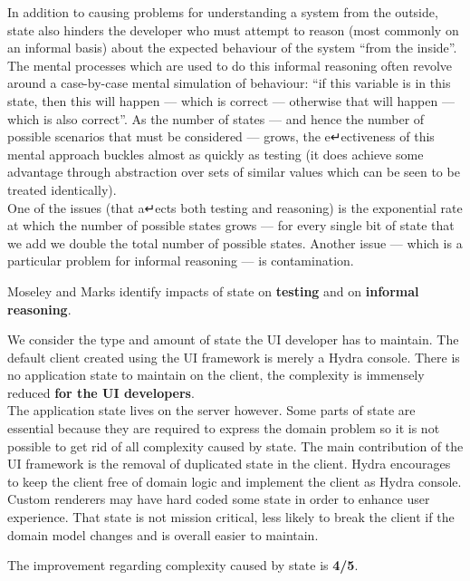 In addition to causing problems for understanding a system from the outside, state also hinders the developer who must attempt to reason (most commonly on an informal basis) about the expected behaviour of the system “from the inside”. \\
The mental processes which are used to do this informal reasoning often revolve around a case-by-case mental simulation of behaviour: “if this variable is in this state, then this will happen — which is correct — otherwise that will happen — which is also correct”. As the number of states — and hence the number of possible scenarios that must be considered — grows, the e↵ectiveness of this mental approach buckles almost as quickly as testing (it does achieve some advantage through abstraction over sets of similar values which can be seen to be treated identically). \\
One of the issues (that a↵ects both testing and reasoning) is the exponential rate at which the number of possible states grows — for every single bit of state that we add we double the total number of possible states. Another issue — which is a particular problem for informal reasoning — is contamination. \citep{outoftarpit}

Moseley and Marks identify impacts of state on \textbf{testing} and on \textbf{informal reasoning}.

We consider the type and amount of state the UI developer has to maintain. The default client created using the UI framework is merely a Hydra console. There is no application state to maintain on the client, the complexity is immensely reduced \textbf{for the UI developers}. \\
The application state lives on the server however. Some parts of state are essential because they are required to express the domain problem so it is not possible to get rid of all complexity caused by state. The main contribution of the UI framework is the removal of duplicated state in the client. Hydra encourages to keep the client free of domain logic and implement the client as Hydra console. Custom renderers may have hard coded some state in order to enhance user experience. That state is not mission critical, less likely to break the client if the domain model changes and is overall easier to maintain.

The improvement regarding complexity caused by state is \textbf{4/5}.

